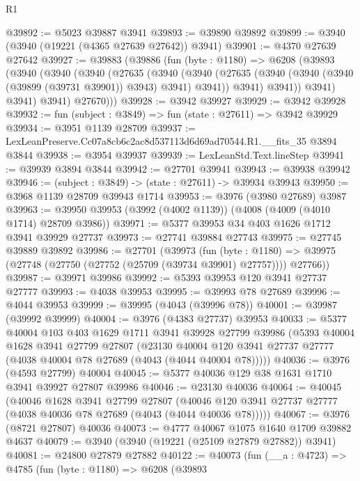 \begin{lexlean}{R1}
\begin{coremodule}
@39892 := @5023 @39887 @3941
@39893 := @39890 @39892
@39899 := @3940 (@3940 (@19221 (@4365 @27639 @27642)) @3941)
@39901 := @4370 @27639 @27642
@39927 := @39883
    (@39886
      (fun (byte : @1180) =>
      @6208
        (@39893
          (@3940
            (@3940
              (@3940
                (@27635
                  (@3940
                    (@3940
                      (@27635 (@3940 (@3940 (@3940 (@39899 (@39731 @39901)) @3943) @3941) @3941))
                      @3941)
                    @3941))
                @3941)
              @3941)
            @3941)
          @27670)))
@39928 := @3942 @39927
@39929 := @3942 @39928
@39932 := fun (subject : @3849) => fun (state : @27611) => @3942 @39929
@39934 := @3951 @1139 @28709
@39937 := LexLeanPreserve.Cc07a8cb6c2ac8d537113d6d69ad70544.R1.__fits_35 @3894 @3844
@39938 := @3954 @39937
@39939 := LexLeanStd.Text.lineStep
@39941 := @39939 @3894 @3844
@39942 := @27701 @39941
@39943 := @39938 @39942
@39946 := (subject : @3849) -> (state : @27611) -> @39934 @39943
@39950 := @3968 @1139 @28709 @39943 @1714
@39953 := @3976 (@3980 @27689) @3987
@39963 := @39950 @39953 (@3992 (@4002 @1139)) (@4008 (@4009 (@4010 @1714) @28709 @3986))
@39971 := @5377 @39953 @34 @403 @1626 @1712 @3941 @39929 @27737
@39973 := @27741 @39884 @27743
@39975 := @27745 @39889 @39892
@39986 := @27701
    (@39973
      (fun (byte : @1180) =>
      @39975 (@27748 (@27750 (@27752 (@25709 (@39734 @39901) @27757)))) @27766))
@39987 := @39971 @39986
@39992 := @5393 @39953 @120 @3941 @27737 @27777
@39993 := @4038 @39953
@39995 := @39993 @78 @27689
@39996 := @4044 @39953
@39999 := @39995 (@4043 (@39996 @78))
@40001 := @39987 (@39992 @39999)
@40004 := @3976 (@4383 @27737) @39953
@40033 := @5377
    @40004
    @103
    @403
    @1629
    @1711
    @3941
    @39928
    @27799
    @39986
    (@5393
      @40004
      @1628
      @3941
      @27799
      @27807
      (@23130 @40004 @120 @3941 @27737 @27777 (@4038 @40004 @78 @27689 (@4043 (@4044 @40004 @78)))))
@40036 := @3976 (@4593 @27799) @40004
@40045 := @5377 @40036 @129 @38 @1631 @1710 @3941 @39927 @27807 @39986
@40046 := @23130 @40036
@40064 := @40045
    (@40046
      @1628
      @3941
      @27799
      @27807
      (@40046 @120 @3941 @27737 @27777 (@4038 @40036 @78 @27689 (@4043 (@4044 @40036 @78)))))
@40067 := @3976 (@8721 @27807) @40036
@40073 := @4777 @40067 @1075 @1640 @1709 @39882 @4637
@40079 := @3940 (@3940 (@19221 (@25109 @27879 @27882)) @3941)
@40081 := @24800 @27879 @27882
@40122 := @40073
    (fun (__a : @4723) =>
    @4785
      (fun (byte : @1180) =>
      @6208
        (@39893

\end{coremodule}
\end{lexlean}

